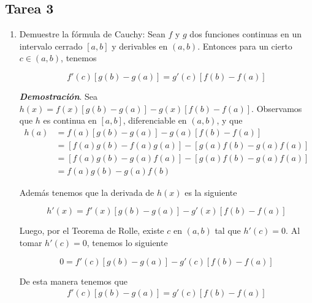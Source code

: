 \documentclass{report}
\begin{document}

    \pagebreak
    \subsection*{Tarea 3}
    \begin{enumerate}
        \item Demuestre la fórmula de Cauchy: Sean $f$ y $g$ dos funciones continuas en un intervalo cerrado $\left[a,b\right]$ y derivables en $\left(a, b\right)$. Entonces para un cierto $c \in \left(a, b\right)$, tenemos

        $$f'(c)\left[g(b)-g(a)\right] = g'(c)\left[f(b)-f(a)\right]$$

        \textit{\textbf{Demostración}}. Sea \(h(x) = f(x)[g(b) - g(a)] - g(x)[f(b) - f(a)]\). Observamos que \(h\) es continua en \([a, b]\), diferenciable en \((a, b)\), y que
        \begin{align*}
            h(a) &= f(a)[g(b) - g(a)] - g(a)[f(b) - f(a)] \\
            &= [f(a)g(b) - f(a)g(a)] - [g(a)f(b) - g(a)f(a)] \\
            &= [f(a)g(b) - g(a)f(a)] - [g(a)f(b) - g(a)f(a)] \\
            &= f(a)g(b) - g(a)f(b)
        \end{align*}

        Además tenemos que la derivada de $h(x)$ es la siguiente

        \[ h'(x) = f'(x)[g(b) - g(a)] - g'(x)[f(b) - f(a)] \]

        Luego, por el Teorema de Rolle, existe \(c\) en \((a, b)\) tal que \(h'(c) = 0\). Al tomar \(h'(c) = 0\), tenemos lo siguiente

        \[ 0 = f'(c)[g(b) - g(a)] - g'(c)[f(b) - f(a)] \]

        De esta manera tenemos que
        \begin{align*}
            f'(c)[g(b) - g(a)] = g'(c)[f(b) - f(a)]
        \end{align*}


\end{enumerate}
\end{document}
